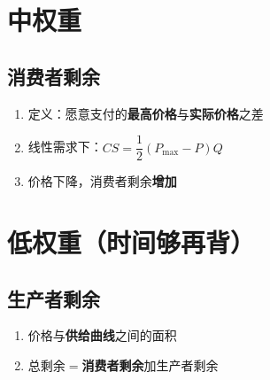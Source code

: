 \documentclass[a4paper,fontset=windows]{ctexart}
\newlength{\sbw}
\newcommand{\kw}[1]{\ifdefined\SBFILL\settowidth{\sbw}{#1}\underline{\hspace*{\dimexpr\sbw+0.6em\relax}}\else\textbf{#1}\fi}
\begin{document}
\section{中权重}
\subsection{消费者剩余}
\begin{enumerate}
\item 定义：愿意支付的\kw{最高价格}与\kw{实际价格}之差
\item 线性需求下：$CS=\dfrac12(P_{\max}-P)Q$
\item 价格下降，消费者剩余\kw{增加}
\end{enumerate}

\section{低权重（时间够再背）}
\subsection{生产者剩余}
\begin{enumerate}
\item 价格与\kw{供给曲线}之间的面积
\item 总剩余$=$\kw{消费者剩余}加生产者剩余
\end{enumerate}
\end{document}
